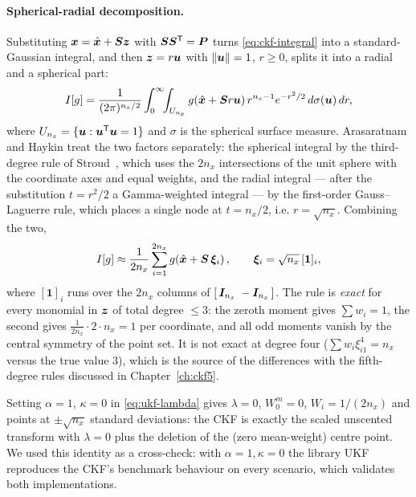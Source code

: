 \paragraph{Spherical-radial decomposition.} Substituting $\bm{x} = \hat{\bm{x}} + \bm{S}\bm{z}$ with
$\bm{S}\bm{S}^{\mathsf{T}} = \bm{P}$ turns \eqref{eq:ckf-integral} into a standard-Gaussian integral, and then
$\bm{z} = r\bm{u}$ with $\left\lVert \bm{u} \right\rVert=1$, $r\ge0$, splits it into a radial and a spherical
part:
\begin{equation}
I[g] = \frac{1}{(2\pi)^{n_x/2}}\int_0^\infty\!\!\int_{U_{n_x}} g(\hat{\bm{x}} + \bm{S} r\bm{u})\,
 r^{n_x-1}e^{-r^2/2}\,d\sigma(\bm{u})\,dr,
\label{eq:ckf-sr}
\end{equation}
where $U_{n_x}=\{\bm{u}: \bm{u}^{\mathsf{T}}\bm{u}=1\}$ and $\sigma$ is the spherical surface measure.
Arasaratnam and Haykin treat the two factors separately: the spherical integral by the
third-degree rule of Stroud~\cite{stroud1971}, which uses the $2n_x$ intersections of the
unit sphere with the coordinate axes and equal weights, and the radial integral --- after the
substitution $t = r^2/2$ a Gamma-weighted integral --- by the first-order Gauss--Laguerre
rule, which places a single node at $t = n_x/2$, i.e. $r = \sqrt{n_x}$. Combining the two,
\begin{equation}
I[g] \approx \frac{1}{2n_x}\sum_{i=1}^{2n_x} g\!\left(\hat{\bm{x}} + \bm{S}\,\bm{\xi}_i\right),
\qquad
\bm{\xi}_i = \sqrt{n_x}\,[\bm{1}]_i,
\label{eq:ckf-rule}
\end{equation}
where $[\bm{1}]_i$ runs over the $2n_x$ columns of $[\,\bm{I}_{n_x}\; -\bm{I}_{n_x}\,]$. The rule is
\emph{exact} for every monomial in $\bm{z}$ of total degree $\le 3$: the zeroth moment gives
$\sum w_i = 1$, the second gives $\frac{1}{2n_x}\cdot 2\cdot n_x = 1$ per coordinate, and all
odd moments vanish by the central symmetry of the point set. It is not exact at degree four
($\sum w_i \xi_{i1}^4 = n_x$ versus the true value $3$), which is the source of the
differences with the fifth-degree rules discussed in Chapter~\ref{ch:ckf5}.

\begin{remark}
Setting $\alpha = 1$, $\kappa = 0$ in \eqref{eq:ukf-lambda} gives $\lambda = 0$,
$W_0^m = 0$, $W_{i} = 1/(2n_x)$ and points at $\pm\sqrt{n_x}$ standard deviations: the CKF is
exactly the scaled unscented transform with $\lambda = 0$ plus the deletion of the (zero
mean-weight) centre point. We used this identity as a cross-check: with $\alpha=1,\kappa=0$
the library UKF reproduces the CKF's benchmark behaviour on every scenario, which validates
both implementations.
\end{remark}

